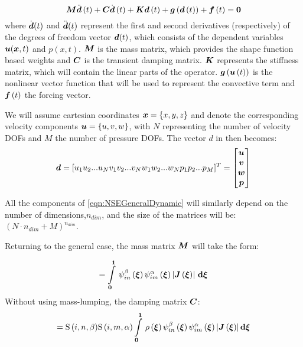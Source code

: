 \begin{equation}
  \matr{M}\fnof{\ddot{\vectr{d}}}{t}+\matr{C}\fnof{\dot{\vectr{d}}}{t}+\matr{K}\fnof{\vectr{d}}{t}+
  \fnof{\vectr{g}}{\fnof{\vectr{d}}{t}}+\fnof{\vectr{f}}{t}=\vectr{0}
  \label{eqn:NSEGeneralDynamic}
\end{equation}
where $\dot{\boldsymbol{d}}(t)$ and $\ddot{\boldsymbol{d}}(t)$ represent the first and
second derivatives (respectively) of the degrees of freedom vector
$\boldsymbol{d}(t)$, which consists of the dependent variables
$\boldsymbol{u}(\boldsymbol{x},t)$ and $p(x,t)$. $\matr{M}$ is the mass matrix, which
provides the shape function based weights and $\matr{C}$ is the transient
damping matrix. $\matr{K}$ represents the stiffness matrix, which will contain
the linear parts of the operator. $ \boldsymbol{g}\left(  \boldsymbol{u}\left( t \right)  \right) $ is
the nonlinear vector function that will be used to represent the convective
term and $ \boldsymbol{f}\left( t \right) $ the forcing vector.

We will assume cartesian coordinates $\boldsymbol{x}=\left\{ x,y,z \right\}$ and denote the
corresponding velocity components $\boldsymbol{u}=\left\{ u,v,w \right\}$, with $N$
representing the number of velocity DOFs and $M$ the number of pressure
DOFs. The vector $d$ in then becomes:
\begin{equation}
  \boldsymbol{d}=[u_1u_2...u_Nv_1v_2...v_Nw_1w_2...w_Np_1p_2...p_M]^T=
  \begin{bmatrix}\boldsymbol{u}\\\boldsymbol{v}\\\boldsymbol{w}\\\boldsymbol{p}\end{bmatrix}
\end{equation}

All the components of \ref{eqn:NSEGeneralDynamic} will similarly depend on the
number of dimensions,$n_{dim}$, and the size of the matrices will be:
$(N{\cdot}{n_{dim}}+M)^{n_{dim}}$.

Returning to the general case, the mass matrix $\matr{M}$ will take the form:

\begin{equation}
[M^{\alpha\beta}_{mn}]=\gint{\vectr{0}}{\vectr{1}}{\idxgbfn{i}{n}{\beta}{\vectr{\xi}}\idxgbfn{i}{m}{\alpha}{\vectr{\xi}}
    \abs{\fnof{\matr{J}}{\vectr{\xi}}}}{\vectr{\xi}}
\end{equation}
Without using mass-lumping, the damping matrix $\matr{C}$:
\begin{equation}
  [C^{\alpha\beta}_{mn}]={\idxgsf{i}{n}{\beta}}{\idxgsf{i}{m}{\alpha}}
  \gint{\vectr{0}}{\vectr{1}}{\fnof{\rho}{\vectr{\xi}}{\idxgbfn{i}{n}{\beta}{\vectr{\xi}}\idxgbfn{i}{m}{\alpha}{\vectr{\xi}}
    \abs{\fnof{\matr{J}}{\vectr{\xi}}}}}{\vectr{\xi}}
\end{equation}

